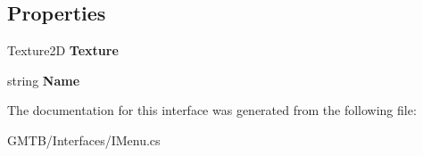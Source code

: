 \subsection*{Properties}
\begin{DoxyCompactItemize}
\item 
\mbox{\label{interface_g_m_t_b_1_1_interfaces_1_1_i_menu_a8f81b7cd2b5af5986505cd04a495bdc8}} 
Texture2D {\bfseries Texture}
\item 
\mbox{\label{interface_g_m_t_b_1_1_interfaces_1_1_i_menu_a6b457cc4c741893e7ed4baeda39f9e9d}} 
string {\bfseries Name}
\end{DoxyCompactItemize}


The documentation for this interface was generated from the following file\+:\begin{DoxyCompactItemize}
\item 
G\+M\+T\+B/\+Interfaces/I\+Menu.\+cs\end{DoxyCompactItemize}
